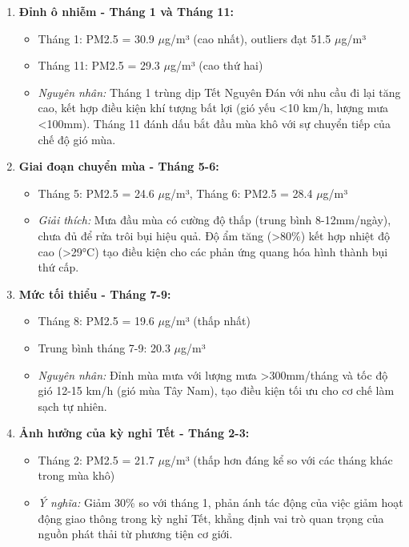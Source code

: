\documentclass[12pt,a4paper]{article}
\begin{document}
\begin{enumerate}
    \item \textbf{Đỉnh ô nhiễm - Tháng 1 và Tháng 11:}
    \begin{itemize}
        \item Tháng 1: PM2.5 = 30.9 $\mu$g/m³ (cao nhất), outliers đạt 51.5 $\mu$g/m³
        \item Tháng 11: PM2.5 = 29.3 $\mu$g/m³ (cao thứ hai)
        \item \textit{Nguyên nhân:} Tháng 1 trùng dịp Tết Nguyên Đán với nhu cầu đi lại tăng cao, kết hợp điều kiện khí tượng bất lợi (gió yếu <10 km/h, lượng mưa <100mm). Tháng 11 đánh dấu bắt đầu mùa khô với sự chuyển tiếp của chế độ gió mùa.
    \end{itemize}
    
    \item \textbf{Giai đoạn chuyển mùa - Tháng 5-6:}
    \begin{itemize}
        \item Tháng 5: PM2.5 = 24.6 $\mu$g/m³, Tháng 6: PM2.5 = 28.4 $\mu$g/m³
        \item \textit{Giải thích:} Mưa đầu mùa có cường độ thấp (trung bình 8-12mm/ngày), chưa đủ để rửa trôi bụi hiệu quả. Độ ẩm tăng (>80\%) kết hợp nhiệt độ cao (>29°C) tạo điều kiện cho các phản ứng quang hóa hình thành bụi thứ cấp.
    \end{itemize}
    
    \item \textbf{Mức tối thiểu - Tháng 7-9:}
    \begin{itemize}
        \item Tháng 8: PM2.5 = 19.6 $\mu$g/m³ (thấp nhất)
        \item Trung bình tháng 7-9: 20.3 $\mu$g/m³
        \item \textit{Nguyên nhân:} Đỉnh mùa mưa với lượng mưa >300mm/tháng và tốc độ gió 12-15 km/h (gió mùa Tây Nam), tạo điều kiện tối ưu cho cơ chế làm sạch tự nhiên.
    \end{itemize}
    
    \item \textbf{Ảnh hưởng của kỳ nghỉ Tết - Tháng 2-3:}
    \begin{itemize}
        \item Tháng 2: PM2.5 = 21.7 $\mu$g/m³ (thấp hơn đáng kể so với các tháng khác trong mùa khô)
        \item \textit{Ý nghĩa:} Giảm 30\% so với tháng 1, phản ánh tác động của việc giảm hoạt động giao thông trong kỳ nghỉ Tết, khẳng định vai trò quan trọng của nguồn phát thải từ phương tiện cơ giới.
    \end{itemize}
\end{enumerate}
\end{document}
